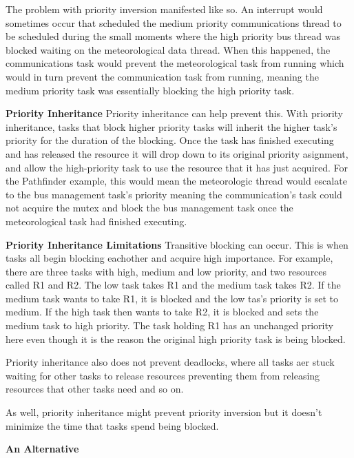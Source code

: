 \documentclass[]{report}
\begin{document}
			The problem with priority inversion manifested like so. An interrupt would sometimes occur that scheduled the medium priority communications thread to be scheduled during the small moments where the high priority bus thread was blocked waiting on the meteorological data thread. When this happened, the communications task would prevent the meteorological task from running which would in turn prevent the communication task from running, meaning the medium priority task was essentially blocking the high priority task\cite{jones1997really}.
			\medskip
			
			\textbf{Priority Inheritance}\newline
			Priority inheritance can help prevent this. With priority inheritance, tasks that block higher priority tasks will inherit the higher task's priority for the duration of the blocking. Once the task has finished executing and has released the resource it will drop down to its original priority asignment, and allow the high-priority task to use the resource that it has just acquired. For the Pathfinder example, this would mean the meteorologic thread would escalate to the bus management task's priority meaning the communication's task could not acquire the mutex and block the bus management task once the meteorological task had finished executing. 
			\medskip
			
			\textbf{Priority Inheritance Limitations}\newline
			Transitive blocking can occur. This is when tasks all begin blocking eachother and acquire high importance. For example, there are three tasks with high, medium and low priority, and two resources called R1 and R2. The low task takes R1 and the medium task takes R2. If the medium task wants to take R1, it is blocked and the low tas's priority is set to medium. If the high task then wants to take R2, it is blocked and sets the medium task to high priority. The task holding R1 has an unchanged priority here even though it is the reason the original high priority task is being blocked.
			
			Priority inheritance also does not prevent deadlocks, where all tasks aer stuck waiting for other tasks to release resources preventing them from releasing resources that other tasks need and so on.
			
			As well, priority inheritance might prevent priority inversion but it doesn't minimize the time that tasks spend being blocked.
			\medskip
			
			\textbf{An Alternative}
\end{document}
